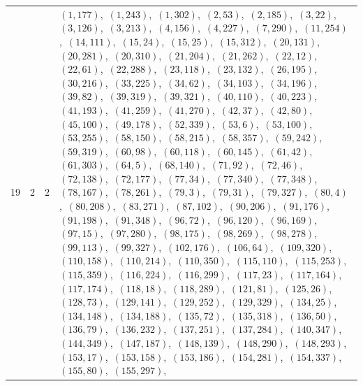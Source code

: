 \documentclass[11pt]{article}
\begin{document}
{\begin{longtable}{@{}rrl>{\raggedright\arraybackslash}p{}@{}}
19 & 2 & $2$ & $(1,177)$,\allowbreak\ $(1,243)$,\allowbreak\ $(1,302)$,\allowbreak\ $(2,53)$,\allowbreak\ $(2,185)$,\allowbreak\ $(3,22)$,\allowbreak\ $(3,126)$,\allowbreak\ $(3,213)$,\allowbreak\ $(4,156)$,\allowbreak\ $(4,227)$,\allowbreak\ $(7,290)$,\allowbreak\ $(11,254)$,\allowbreak\ $(14,111)$,\allowbreak\ $(15,24)$,\allowbreak\ $(15,25)$,\allowbreak\ $(15,312)$,\allowbreak\ $(20,131)$,\allowbreak\ $(20,281)$,\allowbreak\ $(20,310)$,\allowbreak\ $(21,204)$,\allowbreak\ $(21,262)$,\allowbreak\ $(22,12)$,\allowbreak\ $(22,61)$,\allowbreak\ $(22,288)$,\allowbreak\ $(23,118)$,\allowbreak\ $(23,132)$,\allowbreak\ $(26,195)$,\allowbreak\ $(30,216)$,\allowbreak\ $(33,225)$,\allowbreak\ $(34,62)$,\allowbreak\ $(34,103)$,\allowbreak\ $(34,196)$,\allowbreak\ $(39,82)$,\allowbreak\ $(39,319)$,\allowbreak\ $(39,321)$,\allowbreak\ $(40,110)$,\allowbreak\ $(40,223)$,\allowbreak\ $(41,193)$,\allowbreak\ $(41,259)$,\allowbreak\ $(41,270)$,\allowbreak\ $(42,37)$,\allowbreak\ $(42,80)$,\allowbreak\ $(45,100)$,\allowbreak\ $(49,178)$,\allowbreak\ $(52,339)$,\allowbreak\ $(53,6)$,\allowbreak\ $(53,100)$,\allowbreak\ $(53,255)$,\allowbreak\ $(58,150)$,\allowbreak\ $(58,215)$,\allowbreak\ $(58,357)$,\allowbreak\ $(59,242)$,\allowbreak\ $(59,319)$,\allowbreak\ $(60,98)$,\allowbreak\ $(60,118)$,\allowbreak\ $(60,145)$,\allowbreak\ $(61,42)$,\allowbreak\ $(61,303)$,\allowbreak\ $(64,5)$,\allowbreak\ $(68,140)$,\allowbreak\ $(71,92)$,\allowbreak\ $(72,46)$,\allowbreak\ $(72,138)$,\allowbreak\ $(72,177)$,\allowbreak\ $(77,34)$,\allowbreak\ $(77,340)$,\allowbreak\ $(77,348)$,\allowbreak\ $(78,167)$,\allowbreak\ $(78,261)$,\allowbreak\ $(79,3)$,\allowbreak\ $(79,31)$,\allowbreak\ $(79,327)$,\allowbreak\ $(80,4)$,\allowbreak\ $(80,208)$,\allowbreak\ $(83,271)$,\allowbreak\ $(87,102)$,\allowbreak\ $(90,206)$,\allowbreak\ $(91,176)$,\allowbreak\ $(91,198)$,\allowbreak\ $(91,348)$,\allowbreak\ $(96,72)$,\allowbreak\ $(96,120)$,\allowbreak\ $(96,169)$,\allowbreak\ $(97,15)$,\allowbreak\ $(97,280)$,\allowbreak\ $(98,175)$,\allowbreak\ $(98,269)$,\allowbreak\ $(98,278)$,\allowbreak\ $(99,113)$,\allowbreak\ $(99,327)$,\allowbreak\ $(102,176)$,\allowbreak\ $(106,64)$,\allowbreak\ $(109,320)$,\allowbreak\ $(110,158)$,\allowbreak\ $(110,214)$,\allowbreak\ $(110,350)$,\allowbreak\ $(115,110)$,\allowbreak\ $(115,253)$,\allowbreak\ $(115,359)$,\allowbreak\ $(116,224)$,\allowbreak\ $(116,299)$,\allowbreak\ $(117,23)$,\allowbreak\ $(117,164)$,\allowbreak\ $(117,174)$,\allowbreak\ $(118,18)$,\allowbreak\ $(118,289)$,\allowbreak\ $(121,81)$,\allowbreak\ $(125,26)$,\allowbreak\ $(128,73)$,\allowbreak\ $(129,141)$,\allowbreak\ $(129,252)$,\allowbreak\ $(129,329)$,\allowbreak\ $(134,25)$,\allowbreak\ $(134,148)$,\allowbreak\ $(134,188)$,\allowbreak\ $(135,72)$,\allowbreak\ $(135,318)$,\allowbreak\ $(136,50)$,\allowbreak\ $(136,79)$,\allowbreak\ $(136,232)$,\allowbreak\ $(137,251)$,\allowbreak\ $(137,284)$,\allowbreak\ $(140,347)$,\allowbreak\ $(144,349)$,\allowbreak\ $(147,187)$,\allowbreak\ $(148,139)$,\allowbreak\ $(148,290)$,\allowbreak\ $(148,293)$,\allowbreak\ $(153,17)$,\allowbreak\ $(153,158)$,\allowbreak\ $(153,186)$,\allowbreak\ $(154,281)$,\allowbreak\ $(154,337)$,\allowbreak\ $(155,80)$,\allowbreak\ $(155,297)$,\allowbreak\ 
\end{longtable}}
\end{document}
